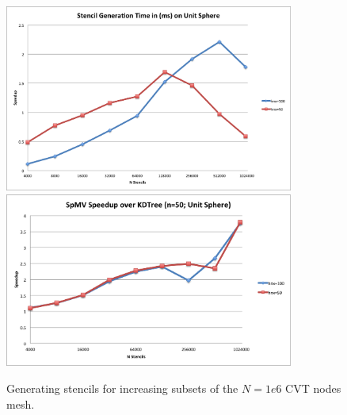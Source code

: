 \documentclass[11pt]{report}
\begin{document}
\begin{figure}
\centering
\includegraphics[width=9.5cm]{../figures/stencils/sphere_subsets_1m_stencil_gen_speedup.png}
\includegraphics[width=9.5cm]{../figures/stencils/sphere_subsets_1m_spmv_speedup.png}
\caption{Generating stencils for increasing subsets of the $N=1e6$ CVT nodes mesh.}
\label{fig:hash_results}
\end{figure}
\end{document}

